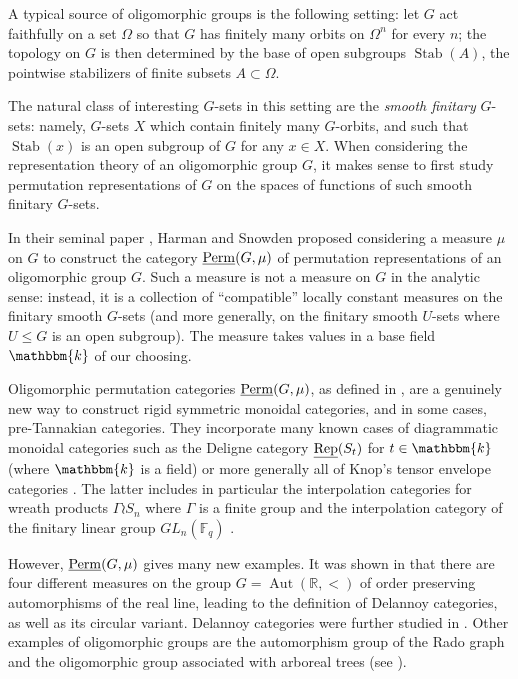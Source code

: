 \documentclass[11pt,a4paper]{amsart}
\theoremstyle{plain}%
\theoremstyle{definition}
\theoremstyle{remark}
\newcommand{\Aut}{{\operatorname{Aut}}}
\newcommand{\uRep}{\underline{{\rm Rep}}}
\newcommand{\Perm}{\underline{{\rm Perm}}}
\newcommand{\F}{{\mathbb F}}
\newcommand{\kk}{\mathbbm{k}}
\newcommand{\Stab}{\operatorname{Stab}}
\begin{document}
A typical source of oligomorphic groups is the {following} setting: let $G$ act faithfully on a set $\Omega$ so that $G$ has finitely many orbits on $\Omega^n$ for every $n$; the topology on $G$ is then determined by the base of {open} subgroups $\Stab(A)$, the pointwise stabilizers of finite subsets $A\subset \Omega$.

The natural class of interesting $G$-sets in this setting are the \emph{smooth finitary} $G$-sets: namely, $G$-sets $X$ which contain finitely many $G$-orbits, and such that $\Stab(x)$ is an open subgroup of $G$ for any $x\in X$. When considering the representation theory of an oligomorphic group $G$, it makes sense to first study permutation representations of $G$ on the spaces of functions of such smooth finitary $G$-sets.

In their seminal paper \cite{HS-oligomorphic}, Harman and Snowden proposed considering a measure $\mu$ on $G$ to construct the category $\Perm(G, \mu)$ of permutation representations of an oligomorphic group $G$. Such a measure is not a measure on $G$ in the analytic sense: instead, it is a collection of ``compatible'' locally constant measures on the finitary smooth $G$-sets (and more generally, on the finitary smooth $U$-sets where $U\leq G$ is an open subgroup). The measure takes values in a base field $\kk$ of our choosing.


Oligomorphic permutation categories $\Perm(G, \mu)$, as defined in \cite{HS-oligomorphic}, are a genuinely new way to construct rigid symmetric monoidal categories, and in some cases, pre-Tannakian categories. They incorporate many known cases of diagrammatic monoidal categories such as the Deligne category $\uRep(S_t)$ for $t \in \kk$ (where $\kk$ is a field) or more generally all of Knop's tensor envelope categories \cite{Knop, Snowden-Knop}. The latter includes in particular the interpolation categories for wreath products $\Gamma \wr S_n$ \cite{Nyobe-Savage} where $\Gamma$ is a finite group and the interpolation category of the finitary linear group $GL_n(\F_q)$ \cite{EAHGL}. 

However, $\Perm(G,\mu)$ gives many new examples. It was shown in \cite{HS-oligomorphic} that there are four different measures on the group $G = \Aut(\mathbb{R}, <)$ of order preserving automorphisms of the real line, leading to the definition of Delannoy categories, as well as its circular variant. Delannoy categories were further studied in \cite{HSS-delannoy, CS-delannoy, CHS-delannoy}. Other examples of oligomorphic groups are the automorphism group of the Rado graph and the {oligomorphic} group associated with arboreal trees (see \cite{HNS}).
\end{document}
